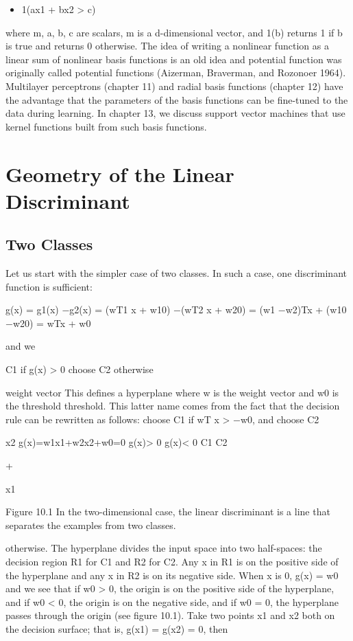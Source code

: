 \begin{itemize}
\item 1(ax1 + bx2 > c)
\end{itemize}

where m, a, b, c are scalars, m is a d-dimensional vector, and 1(b) returns 1 if b is true and returns 0 otherwise. The idea of writing a nonlinear function as a linear sum of nonlinear basis functions is an old idea and potential function was originally called potential functions (Aizerman, Braverman, and Rozonoer 1964). Multilayer perceptrons (chapter 11) and radial basis functions (chapter 12) have the advantage that the parameters of the basis functions can be fine-tuned to the data during learning. In chapter 13, we discuss support vector machines that use kernel functions built from such basis functions.

\section{Geometry of the Linear Discriminant}

\subsection{Two Classes}

Let us start with the simpler case of two classes. In such a case, one discriminant function is sufficient:

g(x) = g1(x) $-$g2(x) = (wT1 x + w10) $-$(wT2 x + w20) = (w1 $-$w2)Tx + (w10 $-$w20) = wTx + w0

and we

C1 if g(x) > 0 choose C2 otherwise

weight vector This defines a hyperplane where w is the weight vector and w0 is the threshold threshold. This latter name comes from the fact that the decision rule can be rewritten as follows: choose C1 if wT x > $-$w0, and choose C2

x2 g(x)=w1x1+w2x2+w0=0 g(x)> 0 g(x)< 0 C1 C2

+

x1

Figure 10.1 In the two-dimensional case, the linear discriminant is a line that separates the examples from two classes.

otherwise. The hyperplane divides the input space into two half-spaces: the decision region R1 for C1 and R2 for C2. Any x in R1 is on the positive side of the hyperplane and any x in R2 is on its negative side. When x is 0, g(x) = w0 and we see that if w0 > 0, the origin is on the positive side of the hyperplane, and if w0 < 0, the origin is on the negative side, and if w0 = 0, the hyperplane passes through the origin (see figure 10.1). Take two points x1 and x2 both on the decision surface; that is, g(x1) = g(x2) = 0, then

